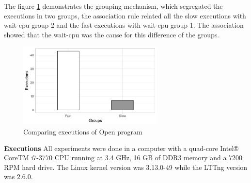     The figure \ref{fig:group} demonstrates the grouping mechanism, which segregated the executions in two groups, the association rule related all the slow executions with wait-cpu group 2 and the fast executions with wait-cpu group 1. The association showed that the wait-cpu was the cause for this difference of the groups.
    
     \begin{figure}[h]
      \centering
        \includegraphics[width=0.65\textwidth]{figures/open-program-groups.png}
        \caption{Comparing executions of Open program}
        \label{fig:group}
    \end{figure}

    
    
\textbf{Executions}
    All experiments were done in a computer with a quad-core Intel® CoreTM i7-3770 CPU running at 3.4 GHz, 16 GB of DDR3 memory and a 7200 RPM hard drive. The Linux kernel version was 3.13.0-49 while the LTTng version was 2.6.0.
  
    
    
